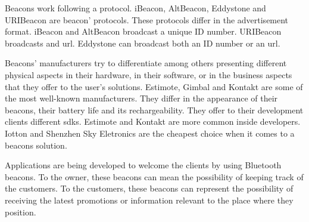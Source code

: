 Beacons work following a protocol. iBeacon, AltBeacon, Eddystone and URIBeacon are beacon' protocols. These protocols differ in the advertisement format. iBeacon and AltBeacon broadcast a unique ID number. URIBeacon broadcasts and \gls{url}. Eddystone can broadcast both an ID number or an \gls{url}.

Beacons' manufacturers try to differentiate among others presenting different physical aspects in their hardware, in their software, or in the business aspects that they offer to the user's solutions. Estimote, Gimbal and Kontakt are some of the most well-known manufacturers. They differ in the appearance of their beacons, their battery life and its rechargeability. They offer to their development clients different \gls{sdk}s. Estimote and Kontakt are more common inside developers. Iotton and Shenzhen Sky Eletronics are the cheapest choice when it comes to a beacons solution.

Applications are being developed to welcome the clients by using Bluetooth beacons. To the owner, these beacons can mean the possibility of keeping track of the customers. To the customers, these beacons can represent the possibility of receiving the latest promotions or information relevant to the place where they position.
